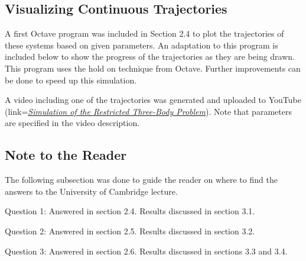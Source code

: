 \documentclass{article}
\begin{document}
\subsection{Visualizing Continuous Trajectories}

A first Octave program was included in Section 2.4 to plot the trajectories of these systems based on given parameters. An adaptation to this program is included below to show the progress of the trajectories as they are being drawn. This program uses the hold on technique from Octave. Further improvements can be done to speed up this simulation.



A video including one of the trajectories was generated and uploaded to YouTube (link=\href{https://www.youtube.com/watch?v=ne1JoJwG-Hc}{\textit{Simulation of the Restricted Three-Body Problem}}). Note that parameters are specified in the video description.

\subsection{Note to the Reader}

The following subsection was done to guide the reader on where to find the answers to the University of Cambridge lecture.

Question 1: Answered in section 2.4. Results discussed in section 3.1.

Question 2: Answered in section 2.5. Results discussed in section 3.2.

Question 3: Answered in section 2.6. Results discussed in sections 3.3 and 3.4.


\newpage

\begin{thebibliography}{99}







\end{thebibliography}
\end{document}
